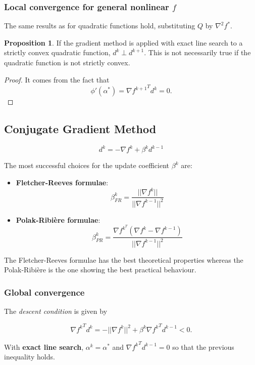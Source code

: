 \documentclass[a4paper, 10pt, twocolumn]{article}
\theoremstyle{definition}
\newtheorem{prop}[theorem]{Proposition}
\theoremstyle{remark}
\newcommand{\al}{\alpha}
\begin{document}
\subsubsection*{Local convergence for general nonlinear $f$}

The same results as for quadratic functions hold, substituting $Q$ by $\nabla^2f^*$.

\begin{prop}
If the gradient method is applied with exact line search to a strictly convex quadratic function, $d^k \perp d^{k+1}$. This is not necessarily true if the quadratic function is not strictly convex.
\begin{proof}
It comes from the fact that
$$
\phi'(\al^*) = {\nabla f^{k+1}}^Td^k = 0.
$$
\end{proof}
\end{prop}


\subsection{Conjugate Gradient Method}

$$
\boxed{d^k = -\nabla f^k + \beta^kd^{k-1}}
$$

The most successful choices for the update coefficient $\beta^k$ are:

\begin{itemize}
\item \textbf{Fletcher-Reeves formulae}:
\vspace{5pt}
$$
\beta^k_{FR} = \frac{|| \nabla f^k||}{||\nabla f^{k-1}||^2}
$$
\item \textbf{Polak-Ribière formulae}:
\vspace{5pt}
$$
\beta^k_{PR} = \frac{\nabla f^{k^T}(\nabla f^k - \nabla f^{k-1})}{||\nabla f^{k-1}||^2}
$$
\end{itemize}

The Fletcher-Reeves formulae has the best theoretical properties whereas the Polak-Ribière is the one showing the best practical behaviour.

\subsubsection*{Global convergence}

The \textit{descent condition} is given by

$$
{\nabla f^k}^Td^k = -||\nabla f^k||^2 + \beta^k{\nabla f^k}^Td^{k-1} < 0.
$$

With \textbf{exact line search}, $\al^k = \al^*$ and ${\nabla f^k}^Td^{k-1} = 0$ so that the previous inequality holds.
\end{document}

